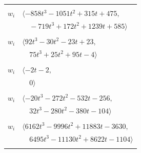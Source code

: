 \documentclass[11pt]{article}
\begin{document}
\begin{longtable}{@{}ll@{}}
\addlinespace[2pt]
\multicolumn{2}{@{}p{0.97\textwidth}@{}}{$i=36$, $D_i=8$, $\rho_{ij}$: $3{:}2, \allowbreak 7{:}2, \allowbreak 8{:}2, \allowbreak 9{:}2, \allowbreak 14{:}1, \allowbreak 15{:}2, \allowbreak 18{:}2, \allowbreak 19{:}1, \allowbreak 24{:}2, \allowbreak 27{:}2, \allowbreak 40{:}1, \allowbreak 51{:}2$}\\
$w_i$ & $\langle -858t^{3}-1051t^{2}+315t+475,$\\
 & $\quad -719t^{3}+172t^{2}+1239t+585\rangle$\\
\addlinespace[2pt]
\multicolumn{2}{@{}p{0.97\textwidth}@{}}{$i=37$, $D_i=4$, $\rho_{ij}$: $7{:}2, \allowbreak 13{:}2, \allowbreak 14{:}1, \allowbreak 18{:}1, \allowbreak 21{:}2, \allowbreak 26{:}1, \allowbreak 28{:}1, \allowbreak 48{:}1, \allowbreak 50{:}2, \allowbreak 51{:}2, \allowbreak 55{:}1, \allowbreak 60{:}1$}\\
$w_i$ & $\langle 92t^{3}-30t^{2}-23t+23,$\\
 & $\quad 75t^{3}+25t^{2}+95t-4\rangle$\\
\addlinespace[2pt]
\multicolumn{2}{@{}p{0.97\textwidth}@{}}{$i=38$, $D_i=1$, $\rho_{ij}$: $6{:}2, \allowbreak 7{:}1, \allowbreak 17{:}1, \allowbreak 52{:}1$}\\
$w_i$ & $\langle -2t-2,$\\
 & $\quad 0\rangle$\\
\addlinespace[2pt]
\multicolumn{2}{@{}p{0.97\textwidth}@{}}{$i=39$, $D_i=4$, $\rho_{ij}$: $3{:}1, \allowbreak 4{:}1, \allowbreak 5{:}1, \allowbreak 18{:}1, \allowbreak 23{:}1, \allowbreak 30{:}2, \allowbreak 34{:}2, \allowbreak 58{:}2, \allowbreak 59{:}2$}\\
$w_i$ & $\langle -20t^{3}-272t^{2}-532t-256,$\\
 & $\quad 32t^{3}-280t^{2}-380t-104\rangle$\\
\addlinespace[2pt]
\multicolumn{2}{@{}p{0.97\textwidth}@{}}{$i=40$, $D_i=16$, $\rho_{ij}$: $3{:}1, \allowbreak 11{:}2, \allowbreak 14{:}1, \allowbreak 18{:}1, \allowbreak 26{:}1, \allowbreak 35{:}2, \allowbreak 36{:}2, \allowbreak 52{:}1, \allowbreak 54{:}2, \allowbreak 57{:}1, \allowbreak 58{:}1, \allowbreak 59{:}1, \allowbreak 61{:}1$}\\
$w_i$ & $\langle 6162t^{3}-9996t^{2}+11883t-3630,$\\
 & $\quad 6495t^{3}-11130t^{2}+8622t-1104\rangle$\\
\addlinespace[2pt]
\multicolumn{2}{@{}p{0.97\textwidth}@{}}{$i=41$, $D_i=2$, $\rho_{ij}$: $10{:}1, \allowbreak 11{:}1, \allowbreak 23{:}2, \allowbreak 25{:}1, \allowbreak 26{:}1, \allowbreak 52{:}1, \allowbreak 59{:}2$}\\

\end{longtable}
\end{document}
